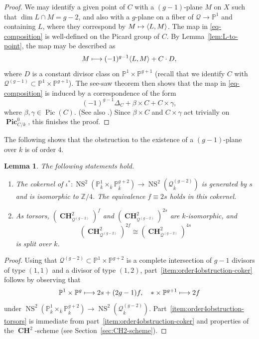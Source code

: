 \documentclass[JEP,XML,SOM,Unicode,NoEqCountersInSection,published]{cedram}
\newcommand\mto{\mathchoice{\longmapsto}{\mapsto}{\mapsto}{\mapsto}}
\theoremstyle{plain}
\newtheorem{lem}[thm]{Lemma}
\theoremstyle{definition}
\DeclareMathOperator{\bCH}{\mathbf{CH}}
\DeclareMathOperator{\NS}{NS}
\DeclareMathOperator{\Pic}{Pic}
\DeclareMathOperator{\bPic}{\mathbf{Pic}}
\newcommand{\kbar}{{\overline{k}}}
\renewcommand\P{\mathbb{P}}
\newcommand\Z{\mathbb{Z}}
\begin{document}
\begin{proof}
We may identify a given point of $C$ with a $(g-1)$-plane $M$ on $X$ such that $\dim L\cap M=g-2$, and also with a $g$-plane on a fiber of $\mathcal{Q}\to \P^1$ and containing $L$, where they correspond by
$M\mto \langle L, M\rangle$.
The map in \eqref{eq-composition} is well-defined on the Picard group of $C$. By Lemma~\ref{lem:L-to-point},
the map may be described as
\[
M \mto (-1)^{g-1} \langle L, M\rangle + C\cdot D,
\]
where $D$ is a constant divisor class on $\P^1\times \P^{g+1}$
(recall that we identify \(C\) with \(\mathcal Q^{(g-1)} \subset\mathbb P^1\times\mathbb P^{g+1}\)).
The see-saw theorem then shows that the map in \eqref{eq-composition} is induced by a correspondence of the form
\[
(-1)^{g-1}\Delta_C + \beta\times C + C\times \gamma,
\]
where $\beta,\gamma \in \Pic(C)$.
(See also \cite[Cor.\,4.12]{Reid-thesis}.)
Since $\beta\times C$ and $C\times \gamma$ act trivially on $\bPic^0_{C/k}$, this finishes the proof.
\end{proof}

The following shows that
the obstruction to the existence of a $(g-1)$-plane over $k$ is of order $4$.

\begin{lem}\label{lem:order4obstruction}
The following statements hold.
\begin{enumerate}
\item\label{item:order4obstruction-coker}
The cokernel of $\iota^*\colon \NS^2(\P^1_\kbar\times_\kbar \P^{g+2}_\kbar)\to \NS^2(\mathcal{Q}^{(g-2)}_{\kbar})$ is generated by \(s\) and is isomorphic to $\Z/4$. The equivalence $f\equiv 2s$ holds in this cokernel.
\item\label{item:order4obstruction-torsors} As torsors,
$(\bCH^2_{\mathcal{Q}^{(g-2)}})^{f}$ and $(\bCH^2_{\mathcal{Q}^{(g-2)}})^{2s}$ are $k$\nobreakdash-isomorphic, and
\[
(\bCH^2_{\mathcal{Q}^{(g-2)}})^{2f} \cong (\bCH^2_{\mathcal{Q}^{(g-2)}})^{4s}
\]
is split over \(k\).
\end{enumerate}
\end{lem}

\begin{proof}
Using that \(\mathcal Q^{(g-2)} \subset\mathbb P^1\times\mathbb P^{g+2}\) is a complete intersection of $g-1$ divisors of type $(1,1)$ and a divisor of type $(1,2)$,
part~\eqref{item:order4obstruction-coker} follows by observing that
\[
\P^1 \times \P^g \mto 2s+(2g-1)f, \quad
* \times \P^{g+1} \mto 2f
\]
under
$\NS^2(\P^1_\kbar\times_\kbar \P^{g+2}_\kbar)\to \NS^2(\mathcal{Q}^{(g-2)}_{\kbar})$.
Part~\eqref{item:order4obstruction-torsors} is immediate from part~\eqref{item:order4obstruction-coker} and properties of the \(\bCH^2\)-scheme (see Section~\ref{sec:CH2-scheme}).
\end{proof}
\end{document}
